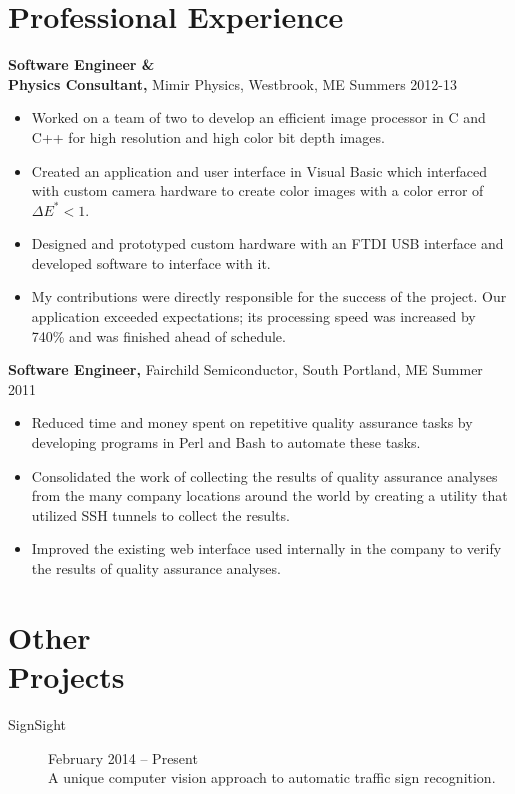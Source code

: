 \documentclass[margin]{res}
\begin{document}
\begin{minipage}{\textwidth}
\begin{resume}
\section{Professional Experience}
{\bf Software Engineer \& \\ Physics Consultant,} Mimir Physics, Westbrook, ME \hfill Summers 2012-13
 \begin{itemize} \itemsep -2pt  %
 \item Worked on a team of two to develop an efficient image processor in C and C++ for high resolution and high color bit depth images. %
 \item Created an application and user interface in Visual Basic which interfaced with custom camera hardware to create color images with a color error of $\Delta E^* < 1$. %
 \item Designed and prototyped custom hardware with an FTDI USB interface  and developed software to interface with it.
 \item My contributions were directly responsible for the success of the project. Our application exceeded expectations; its processing speed was increased by 740\% and was finished ahead of schedule.
 \end{itemize}

 
 
{\bf Software Engineer,} Fairchild Semiconductor, South Portland, ME \hfill  Summer 2011
\begin{itemize} \itemsep -2pt %
 \item Reduced time and money spent on repetitive quality assurance tasks by developing programs in Perl and Bash to automate these tasks.
 \item Consolidated the work of collecting the results of quality assurance analyses from the many company locations around the world by creating a utility that utilized SSH tunnels to collect the results.
 \item Improved the existing web interface used internally in the company to verify the results of quality assurance analyses.
\end{itemize}

\section{Other \\ Projects}
\begin{description}
	\item[SignSight] \hfill February 2014 -- Present \\
		A unique computer vision approach to automatic traffic sign recognition.
\end{description}


\end{resume}
\end{minipage}
\end{document}
